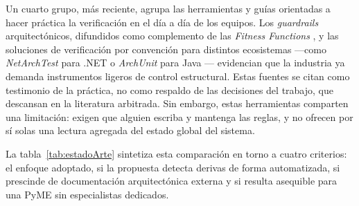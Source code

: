 Un cuarto grupo, más reciente, agrupa las herramientas y guías orientadas a hacer práctica la verificación en el día a día de los equipos. Los \textit{guardrails} arquitectónicos, difundidos como complemento de las \textit{Fitness Functions} \citep{StefanoRossiniMedium}, y las soluciones de verificación por convención para distintos ecosistemas —como \textit{NetArchTest} para .NET \citep{SugumarMedium} o \textit{ArchUnit} para Java \citep{ArchUnitCodecentric}— evidencian que la industria ya demanda instrumentos ligeros de control estructural. Estas fuentes se citan como testimonio de la práctica, no como respaldo de las decisiones del trabajo, que descansan en la literatura arbitrada. Sin embargo, estas herramientas comparten una limitación: exigen que alguien escriba y mantenga las reglas, y no ofrecen por sí solas una lectura agregada del estado global del sistema.

La tabla~\ref{tab:estadoArte} sintetiza esta comparación en torno a cuatro criterios: el enfoque adoptado, si la propuesta detecta derivas de forma automatizada, si prescinde de documentación arquitectónica externa y si resulta asequible para una PyME sin especialistas dedicados.

